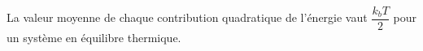 \documentclass[a4paper]{article}
\begin{document}
\pagestyle{fancy}
\fancyhf{}
\setlength{\headheight}{15pt}

\begin{center}
	\large{}
\end{center}


La valeur moyenne de chaque contribution quadratique de l'énergie vaut \(\dfrac{k_bT}{2}\) pour un système en équilibre thermique.
\end{document}
